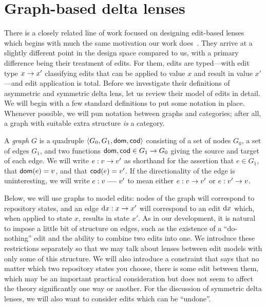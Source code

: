 \section{Graph-based delta lenses}
\label{sec:delta}

There is a closely related line of work focused on designing edit-based
lenses which begins with much the same motivation our work
does~\cite{diskin2011asymmetric,Diskin-Delta11,hermann2011correctness}. They
arrive at a slightly different point in the design space compared to us,
with a primary difference being their treatment of edits. For them, edits
are typed---with edit type $x \to x'$ classifying edits that can be
applied to value $x$ and result in value $x'$---and edit application is
total. Before we investigate their definitions of asymmetric and symmetric
delta lens, let us review their model of edits in detail. We will begin with
a few standard definitions to put some notation in place. Whenever possible,
we will pun notation between graphs and categories; after all, a graph with
suitable extra structure \emph{is} a category.

\begin{definition}
    A \emph{graph} $G$ is a quadruple $\left<G_0,G_1,\mathsf{dom},\mathsf{cod}\right>$
    consisting of a set of nodes $G_0$, a set of edges $G_1$, and two
    functions $\mathsf{dom},\mathsf{cod} \in G_1 \to G_0$ giving the source and target
    of each edge. We will write $e:v \to v'$ as shorthand for the
    assertion that $e \in G_1$, that $\mathsf{dom}(e)=v$, and that $\mathsf{cod}(e)=v'$.
    If the directionality of the edge is uninteresting, we will write $e:v
    \uedge v'$ to mean either $e: v \to v'$ or $e: v' \to v$.
\end{definition}

Below, we will use graphs to model edits: nodes of the graph will correspond
to repository states, and an edge $\textrm{d} x : x \to x'$ will correspond to an
edit $\textrm{d} x$ which, when applied to state $x$, results in state $x'$. As in
our development, it is natural to impose a little bit of structure on edges,
such as the existence of a ``do-nothing'' edit and the ability to combine
two edits into one. We introduce these restrictions separately so that we
may talk about lenses between edit models with only some of this structure.
We will also introduce a constraint that says that no matter which two
repository states you choose, there is some edit between them, which may be
an important practical consideration but does not seem to affect the theory
significantly one way or another. For the discussion of symmetric delta
lenses, we will also want to consider edits which can be ``undone''.

